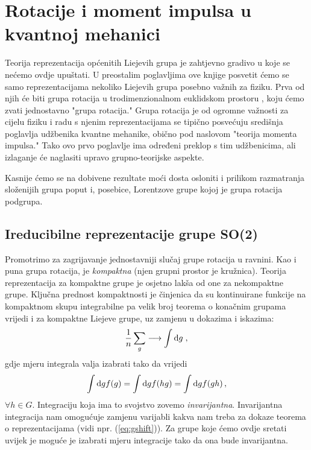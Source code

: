 
\chapter{Rotacije i moment impulsa u kvantnoj mehanici}
\label{ch:rotacije}

Teorija reprezentacija općenitih Liejevih grupa je zahtjevno
gradivo u koje se nećemo ovdje upuštati. U preostalim
poglavljima ove knjige posvetit ćemo se samo
reprezentacijama nekoliko Liejevih grupa posebno važnih
za fiziku. Prva od njih će biti grupa rotacija u trodimenzionalnom
euklidskom prostoru , koju ćemo  zvati 
jednostavno "grupa rotacija." Grupa rotacija je od ogromne
važnosti za cijelu fiziku i radu s njenim reprezentacijama
se tipično posvećuju središnja poglavlja udžbenika kvantne mehanike,
obično pod naslovom "teorija momenta impulsa." 
Tako ovo prvo poglavlje ima određeni preklop s tim udžbenicima, ali
izlaganje će naglasiti upravo grupno-teorijske aspekte.

Kasnije ćemo se na dobivene rezultate moći dosta osloniti i
prilikom razmatranja složenijih grupa poput  i, posebice,
Lorentzove grupe  kojoj je grupa rotacija podgrupa.

\section{Ireducibilne reprezentacije grupe SO(2)}

Promotrimo za zagrijavanje jednostavniji slučaj grupe 
rotacija u ravnini. Kao i puna grupa rotacija,  je
\emph{kompaktna} (njen grupni prostor je kružnica).
Teorija reprezentacija za kompaktne grupe je osjetno lakša
 od one za nekompaktne grupe.
Ključna prednost kompaktnosti je činjenica da su kontinuirane funkcije
na kompaktnom skupu integrabilne pa 
velik broj teorema o konačnim grupama vrijedi i za kompaktne Liejeve
grupe, uz zamjenu u dokazima i iskazima:
\begin{equation}
    \frac{1}{n} \sum_{g} \longrightarrow \int \textrm{d} g \;,
\end{equation}
gdje mjeru integrala valja izabrati tako da vrijedi 
\begin{equation}
  \int \textrm{d} g f(g) = \int \textrm{d} g f(hg) = \int \textrm{d} g f(gh) \,,
\end{equation}
$\forall h \in G$.
Integraciju koja ima to svojstvo zovemo \emph{invarijantna}.  
Invarijantna integracija nam omogućuje zamjenu
varijabli kakva nam treba za dokaze teorema o reprezentacijama
(vidi npr. (\ref{eq:gshift})).
Za grupe koje ćemo ovdje sretati uvijek je moguće je izabrati
mjeru integracije tako da ona bude invarijantna.

